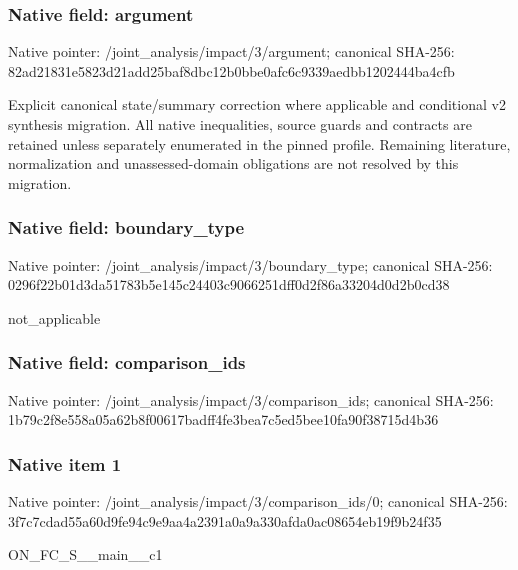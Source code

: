 \documentclass[10pt,a4paper]{article}
\begin{document}
\subsubsection{Native field: argument}
Native pointer: /joint\_\allowbreak{}analysis/impact/3/argument; canonical SHA-256: 82ad21831e5823d21add25baf8dbc12b0bbe0afc6c9339aedbb1202444ba4cfb

\begingroup\raggedright\sloppy Explicit canonical state/\allowbreak{}summary correction where applicable and conditional v2 synthesis migration. All native inequalities,\allowbreak{} source guards and contracts are retained unless separately enumerated in the pinned profile. Remaining literature,\allowbreak{} normalization and unassessed-domain obligations are not resolved by this migration.\par\endgroup

\subsubsection{Native field: boundary\_\allowbreak{}type}
Native pointer: /joint\_\allowbreak{}analysis/impact/3/boundary\_\allowbreak{}type; canonical SHA-256: 0296f22b01d3da51783b5e145c24403c9066251dff0d2f86a33204d0d2b0cd38

\begingroup\raggedright\sloppy not\_\allowbreak{}applicable\par\endgroup

\subsubsection{Native field: comparison\_\allowbreak{}ids}
Native pointer: /joint\_\allowbreak{}analysis/impact/3/comparison\_\allowbreak{}ids; canonical SHA-256: 1b79c2f8e558a05a62b8f00617badff4fe3bea7c5ed5bee10fa90f38715d4b36

\subsubsection{Native item 1}
Native pointer: /joint\_\allowbreak{}analysis/impact/3/comparison\_\allowbreak{}ids/0; canonical SHA-256: 3f7c7cdad55a60d9fe94c9e9aa4a2391a0a9a330afda0ac08654eb19f9b24f35

\begingroup\raggedright\sloppy ON\_\allowbreak{}FC\_\allowbreak{}S\_\allowbreak{}\_\allowbreak{}main\_\allowbreak{}\_\allowbreak{}c1\par\endgroup
\end{document}
